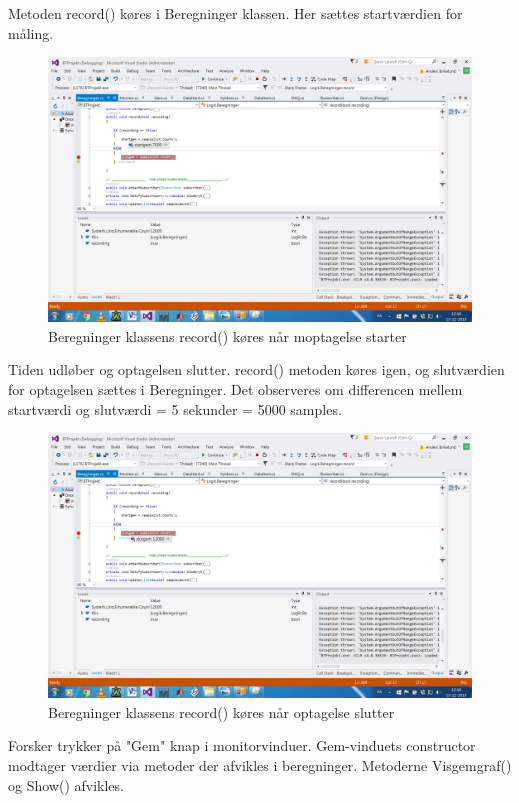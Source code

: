 Metoden record() køres i Beregninger klassen. Her sættes startværdien for måling.

\begin{figure}[H]
	\centering
	\includegraphics[width=1\textwidth]{Figurer/UC6_Record_Start}
	\caption{Beregninger klassens record() køres når moptagelse starter}
\end{figure}

Tiden udløber og optagelsen slutter. record() metoden køres igen, og slutværdien for optagelsen sættes i Beregninger. Det observeres om differencen mellem startværdi og slutværdi = 5 sekunder = 5000 samples.

\begin{figure}[H]
	\centering
	\includegraphics[width=1\textwidth]{Figurer/UC6_Record_Slut}
	\caption{Beregninger klassens record() køres når optagelse slutter}
\end{figure}

Forsker trykker på "Gem" knap i monitorvinduer. Gem-vinduets constructor modtager værdier via metoder der afvikles i beregninger. Metoderne Visgemgraf() og Show() afvikles.

